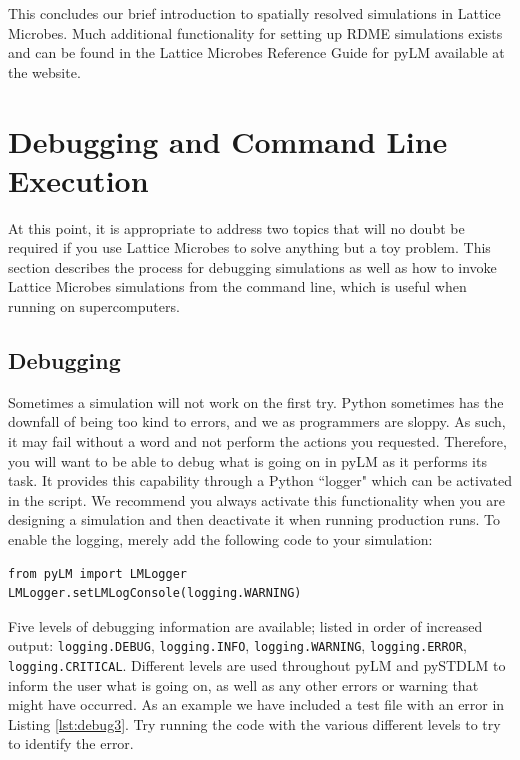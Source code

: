 This concludes our brief introduction to spatially resolved simulations in Lattice Microbes.  Much additional functionality for setting up RDME simulations exists and can be found in the Lattice Microbes Reference Guide for pyLM available at the website.

\section{Debugging and Command Line Execution}
At this point, it is appropriate to address two topics that will no doubt be required if you use Lattice Microbes to solve anything but a toy problem.  This section describes the process for debugging simulations as well as how to invoke Lattice Microbes simulations from the command line, which is useful when running on supercomputers.  

\subsection{Debugging}

Sometimes a simulation will not work on the first try.  Python sometimes has the downfall of being too kind to errors, and we as programmers are sloppy.  As such, it may fail without a word and not perform the actions you requested.  Therefore, you will want to be able to debug what is going on in pyLM as it performs its task.  It provides this capability through a Python ``logger" which can be activated in the script.  We recommend you always activate this functionality when you are designing a simulation and then deactivate it when running production runs.  To enable the logging, merely add the following code to your simulation: \\

\begin{lstlisting}[style=customPy, caption={Code to enable debugging output in pyLM.}, backgroundcolor=\color{mygray}, label=lst:debug1]
from pyLM import LMLogger
LMLogger.setLMLogConsole(logging.WARNING)
\end{lstlisting}

Five levels of debugging information are available; listed in order of increased output: \texttt{logging.DEBUG}, \texttt{logging.INFO}, \texttt{logging.WARNING}, \texttt{logging.ERROR}, \texttt{logging.CRITICAL}.  Different levels are used throughout pyLM and pySTDLM to inform the user what is going on, as well as any other errors or warning that might have occurred.  As an example we have included a test file with an error in Listing \ref{lst:debug3}.  Try running the code with the various different levels to try to identify the error.

